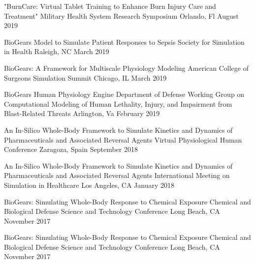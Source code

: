 
\begin{cventries}

  \cventry
    {"BurnCare: Virtual Tablet Training to Enhance Burn Injury Care and Treatment"} %
    {Military Health System Research Symposium} %
    {Orlando, Fl} %
    {August 2019} %
     {
     }

  \cventry
    {BioGears Model to Simulate Patient Responses to Sepsis} %
    {Society for Simulation in Health} %
    {Raleigh, NC} %
    {March 2019} %
    {
    }

  \cventry
    {BioGears: A Framework for Multiscale Physiology Modeling} %
    {American College of Surgeons Simulation Summit} %
    {Chicago, IL} %
    {March 2019} %
    {
    }

  \cventry
    {BioGears Human Physiology Engine} %
    {Department of Defense Working Group on Computational Modeling of Human Lethality, Injury, and Impairment from Blast-Related Threats} %
    {Arlington, Va} %
    {February 2019} %
    {
    }
    
  \cventry
    {An In-Silico Whole-Body Framework to Simulate Kinetics and Dynamics of Pharmaceuticals and Associated Reversal Agents} %
    {Virtual Physiological Human Conference} %
    {Zaragoza, Spain} %
    {September 2018} %
    {
    }

  \cventry
    {An In-Silico Whole-Body Framework to Simulate Kinetics and Dynamics of Pharmaceuticals and Associated Reversal Agents} %
    {International Meeting on Simulation in Healthcare} %
    {Los Angeles, CA} %
    {January 2018} %
    {
    }

      \cventry
    {BioGears: Simulating Whole-Body Response to Chemical Exposure} %
    {Chemical and Biological Defense Science and Technology Conference} %
    {Long Beach, CA} %
    {November 2017} %
    {
    }

      \cventry
    {BioGears: Simulating Whole-Body Response to Chemical Exposure} %
    {Chemical and Biological Defense Science and Technology Conference} %
    {Long Beach, CA} %
    {November 2017} %
    {
    }


\end{cventries}
